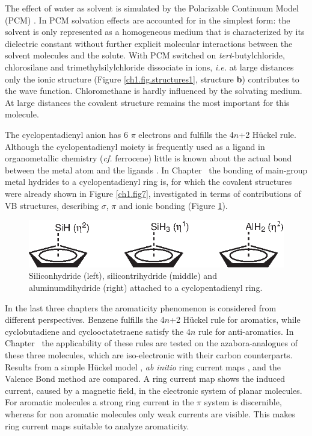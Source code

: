 The effect of water as solvent is simulated by the Polarizable Continuum Model (PCM) \cite{pcm1,pcm2}. In PCM solvation effects are accounted for in the simplest form: the solvent is only represented as a homogeneous medium that is characterized by its dielectric constant without further explicit molecular interactions between the solvent molecules and the solute. With PCM switched on \textit{tert}-butylchloride, chlorosilane and trimethylsilylchloride dissociate in ions, \textit{i.e.} at large distances only the ionic structure (Figure \ref{ch1.fig.structures1}, structure \textbf{b}) contributes to the wave function.  Chloromethane is hardly influenced by the solvating medium. At large distances the covalent structure remains the most important for this molecule.  

The cyclopentadienyl anion has 6 $\pi$ electrons and fulfills the 4$n$+2 H\"{u}ckel rule. Although the cyclopentadienyl moiety is frequently used as a ligand in organometallic chemistry (\textit{cf.} ferrocene) little is known about the actual bond between the metal atom and the ligands \cite{budzelaar}. In Chapter \chcyclopentadienyl\ the bonding of main-group metal hydrides to a cyclopentadienyl ring is, for which the covalent structures were already shown in Figure \ref{ch1.fig7}, investigated in terms of contributions of VB structures, describing $\sigma$, $\pi$ and ionic bonding (Figure \ref{ch1.fig.mhydride}).
\begin{figure}[ht]
\center
\includegraphics{introduction/figures/mhydride.eps}
\caption{Siliconhydride (left), silicontrihydride (middle) and aluminumdihydride (right) attached to a cyclopentadienyl ring.}
\label{ch1.fig.mhydride}
\end{figure}

In the last three chapters the aromaticity phenomenon is considered from different perspectives. Benzene fulfills the 4$n$+2 H\"{u}ckel rule for aromatics, while cyclobutadiene and cyclooctatetraene satisfy the 4$n$ rule for anti-aromatics. In Chapter \chhuckel\ the applicability of these rules are tested on the azabora-analogues of these three molecules, which are iso-electronic with their carbon counterparts. Results from a simple H\"{u}ckel model \cite{huckel1,huckel2,huckel3}, \textit{ab initio} ring current maps \cite{london,keithb1,keithb2}, and the Valence Bond method are compared. A ring current map shows the induced current, caused by a magnetic field, in the electronic system of planar molecules. For aromatic molecules a strong ring current in the $\pi$ system is discernible, whereas for non aromatic molecules only weak currents are visible. This makes ring current maps suitable to analyze aromaticity.

